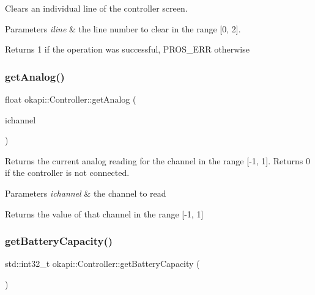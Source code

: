 Clears an individual line of the controller screen.


\begin{DoxyParams}{Parameters}
{\em iline} & the line number to clear in the range \mbox{[}0, 2\mbox{]}. \\
\hline
\end{DoxyParams}
\begin{DoxyReturn}{Returns}
1 if the operation was successful, P\+R\+O\+S\+\_\+\+E\+RR otherwise 
\end{DoxyReturn}
\mbox{\label{classokapi_1_1Controller_a7ae83fb44a837512cffc9610403c3dd6}} 
\subsubsection{\texorpdfstring{getAnalog()}{getAnalog()}}
{\footnotesize\ttfamily float okapi\+::\+Controller\+::get\+Analog (\begin{DoxyParamCaption}\item[{\mbox{\hyperlink{namespaceokapi_afcc83d6a64f075a4dba212ff612c31d0}{Controller\+Analog}}}]{ichannel }\end{DoxyParamCaption})\hspace{0.3cm}{\ttfamily [virtual]}}

Returns the current analog reading for the channel in the range \mbox{[}-\/1, 1\mbox{]}. Returns 0 if the controller is not connected.


\begin{DoxyParams}{Parameters}
{\em ichannel} & the channel to read \\
\hline
\end{DoxyParams}
\begin{DoxyReturn}{Returns}
the value of that channel in the range \mbox{[}-\/1, 1\mbox{]} 
\end{DoxyReturn}
\mbox{\label{classokapi_1_1Controller_a0e4104d3a2d8aa24580f6848737dc061}} 
\subsubsection{\texorpdfstring{getBatteryCapacity()}{getBatteryCapacity()}}
{\footnotesize\ttfamily std\+::int32\+\_\+t okapi\+::\+Controller\+::get\+Battery\+Capacity (\begin{DoxyParamCaption}{ }\end{DoxyParamCaption})\hspace{0.3cm}{\ttfamily [virtual]}}

